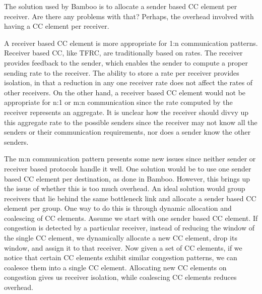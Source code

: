 The solution used by Bamboo is to allocate a sender based CC element per receiver.
Are there any problems with that? Perhaps, the overhead involved with having a
CC element per receiver.

A receiver based CC element is more appropriate for 1:n communication patterns.
Receiver based CC, like TFRC, are traditionally based on
rates. The receiver provides feedback to the sender, which enables the sender to 
compute a proper sending rate to the receiver. The ability to store a rate per
receiver provides isolation, in that a reduction in any one receiver rate does 
not affect the rates of other receivers. On the other hand, a receiver based CC 
element would not be appropriate for n:1 or m:n communication since the 
rate computed by the receiver represents an aggregate. It is unclear how the
receiver should divvy up this aggregate rate to the possible senders since the
receiver may not know all the senders or their communication requirements, nor does
a sender know the other senders. 

The m:n communication pattern presents some new issues since neither sender or
receiver based protocols handle it well. One solution would be to use one sender
based CC element per destination, as done in Bamboo. However, this brings up
the issue of whether this is too much overhead. An ideal solution would group
receivers that lie behind the same bottleneck link and allocate a sender
based CC element per group. One way to do this is through dynamic allocation and
coalescing of CC elements. Assume we start with one sender based CC element.
If congestion is detected by a particular receiver, instead of reducing the window
of the single CC element, we dynamically allocate a new CC element, drop its window,
and assign it to that receiver. Now given a set of CC elements, if we notice 
that certain CC elements exhibit similar congestion patterns, we can coalesce them
into a single CC element. Allocating new CC elements on congestion gives us 
receiver isolation, while coalescing CC elements reduces overhead. 

